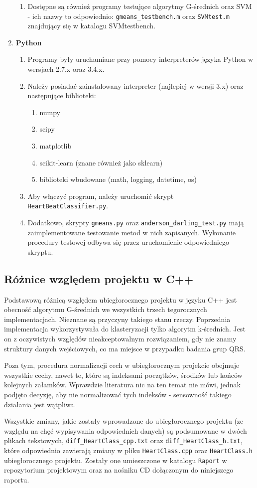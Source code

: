 \begin{enumerate}
\begin{enumerate}
		\item Dostępne są również programy testujące algorytmy G-średnich oraz SVM - ich nazwy to odpowiednio: \texttt{gmeans\_testbench.m} oraz \texttt{SVMtest.m} znajdujący się w katalogu SVMtestbench.
	\end{enumerate}
	\item \textbf{Python}
	\begin{enumerate}
		\item Programy były uruchamiane przy pomocy interpreterów języka Python w wersjach 2.7.x oraz 3.4.x.
		\item Należy posiadać zainstalowany interpreter (najlepiej w wersji 3.x) oraz następujące biblioteki:
		\begin{enumerate}
			\item numpy
			\item scipy
			\item matplotlib
			\item scikit-learn (znane również jako sklearn)
			\item biblioteki wbudowane (math, logging, datetime, os)
		\end{enumerate}
		\item Aby włączyć program, należy uruchomić skrypt \texttt{HeartBeatClassifier.py}.
		\item Dodatkowo, skrypty \texttt{gmeans.py} oraz \texttt{anderson\_darling\_test.py} mają zaimplementowane testowanie metod w nich zapisanych. Wykonanie procedury testowej odbywa się przez uruchomienie odpowiedniego skryptu.
	\end{enumerate}
\end{enumerate}

\subsection{Różnice względem projektu w C++}
\label{sub:roznice_c++}

\qquad Podstawową różnicą względem ubiegłorocznego projektu w języku C++ jest obecność algorytmu G-średnich we wszystkich trzech tegorocznych implementacjach. Nieznane są przyczyny takiego stanu rzeczy. Poprzednia implementacja wykorzystywała do klasteryzacji tylko algorytm k-średnich. Jest on z oczywistych względów nieakceptowalnym rozwiązaniem, gdy nie znamy struktury danych wejściowych, co ma miejsce w przypadku badania grup QRS.

Poza tym, procedura normalizacji cech w ubiegłorocznym projekcie obejmuje wszystkie cechy, nawet te, które są indeksami początków, środków lub końców kolejnych załamków. Wprawdzie literatura nic na ten temat nie mówi, jednak podjęto decyzję, aby nie normalizować tych indeksów - sensowność takiego działania jest wątpliwa. 

Wszystkie zmiany, jakie zostały wprowadzone do ubiegłorocznego projektu (ze względu na chęć wypisywania odpowiednich danych) są podsumowane w dwóch plikach tekstowych, \texttt{diff\_HeartClass\_cpp.txt} oraz \texttt{diff\_HeartClass\_h.txt}, które odpowiednio zawierają zmiany w pliku \texttt{HeartClass.cpp} oraz \texttt{HeartClass.h} ubiegłorocznego projektu. Zostały one umieszczone w katalogu \texttt{Raport} w repozytorium projektowym oraz na nośniku CD dołączonym do niniejszego raportu.
